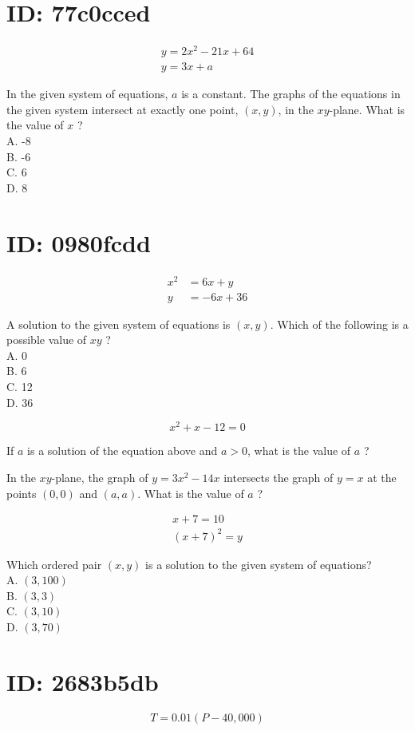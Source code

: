 \section*{ID: 77c0cced}
$$
\begin{gathered}
y=2 x^{2}-21 x+64 \\
y=3 x+a
\end{gathered}
$$

In the given system of equations, $a$ is a constant. The graphs of the equations in the given system intersect at exactly one point, $(x, y)$, in the $x y$-plane. What is the value of $x$ ?\\
A. -8\\
B. -6\\
C. 6\\
D. 8

\section*{ID: 0980fcdd}
$$
\begin{aligned}
x^{2} & =6 x+y \\
y & =-6 x+36
\end{aligned}
$$

A solution to the given system of equations is $(x, y)$. Which of the following is a possible value of $x y$ ?\\
A. 0\\
B. 6\\
C. 12\\
D. 36

$$
x^{2}+x-12=0
$$

If $a$ is a solution of the equation above and $a>0$, what is the value of $a$ ?

In the $x y$-plane, the graph of $y=3 x^{2}-14 x$ intersects the graph of $y=x$ at the points $(0,0)$ and $(a, a)$. What is the value of $a$ ?

$$
\begin{gathered}
x+7=10 \\
(x+7)^{2}=y
\end{gathered}
$$

Which ordered pair $(x, y)$ is a solution to the given system of equations?\\
A. $(3,100)$\\
B. $(3,3)$\\
C. $(3,10)$\\
D. $(3,70)$

\section*{ID: 2683b5db}
$$
T=0.01(P-40,000)
$$

